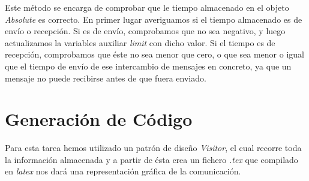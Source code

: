 Este método se encarga de comprobar que le tiempo almacenado en el
objeto \textit{Absolute} es correcto. En primer lugar averiguamos si
el tiempo almacenado es de envío o recepción. Si es de envío,
comprobamos que no sea negativo, y luego actualizamos la variables
auxiliar \textit{limit} con dicho valor. Si el tiempo es de recepción,
comprobamos que éste no sea menor que cero, o que sea menor o igual
que el tiempo de envío de ese intercambio de mensajes en concreto, ya
que un mensaje no puede recibirse antes de que fuera enviado.    

\section{Generación de Código}

Para esta tarea hemos utilizado un patrón de diseño \textit{Visitor},
el cual recorre toda la información almacenada y a partir de ésta crea
un fichero \textit{.tex} que compilado en \textit{latex} nos dará una
representación gráfica de la comunicación.


